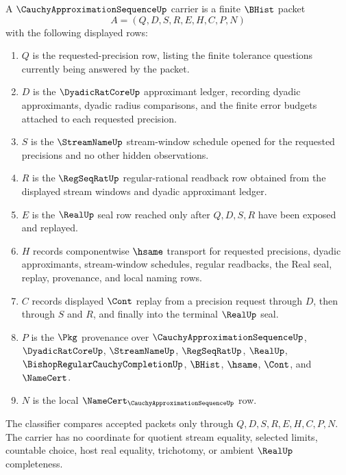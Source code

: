 \begin{definition}\label{def:cauchy-approximation-sequence-carrier}
A $\CauchyApproximationSequenceUp$ carrier is a finite $\BHist$ packet
$$
A=(Q,D,S,R,E,H,C,P,N)
$$
with the following displayed rows:
\begin{enumerate}
\item $Q$ is the requested-precision row, listing the finite tolerance questions currently being answered by the packet.
\item $D$ is the $\DyadicRatCoreUp$ approximant ledger, recording dyadic approximants, dyadic radius comparisons, and the finite error budgets attached to each requested precision.
\item $S$ is the $\StreamNameUp$ stream-window schedule opened for the requested precisions and no other hidden observations.
\item $R$ is the $\RegSeqRatUp$ regular-rational readback row obtained from the displayed stream windows and dyadic approximant ledger.
\item $E$ is the $\RealUp$ seal row reached only after $Q,D,S,R$ have been exposed and replayed.
\item $H$ records componentwise $\hsame$ transport for requested precisions, dyadic approximants, stream-window schedules, regular readbacks, the Real seal, replay, provenance, and local naming rows.
\item $C$ records displayed $\Cont$ replay from a precision request through $D$, then through $S$ and $R$, and finally into the terminal $\RealUp$ seal.
\item $P$ is the $\Pkg$ provenance over $\CauchyApproximationSequenceUp$, $\DyadicRatCoreUp$, $\StreamNameUp$, $\RegSeqRatUp$, $\RealUp$, $\BishopRegularCauchyCompletionUp$, $\BHist$, $\hsame$, $\Cont$, and $\NameCert$.
\item $N$ is the local $\NameCert_{\CauchyApproximationSequenceUp}$ row.
\end{enumerate}
The classifier compares accepted packets only through $Q,D,S,R,E,H,C,P,N$. The carrier has no coordinate for quotient stream equality, selected limits, countable choice, host real equality, trichotomy, or ambient $\RealUp$ completeness.
\end{definition}

